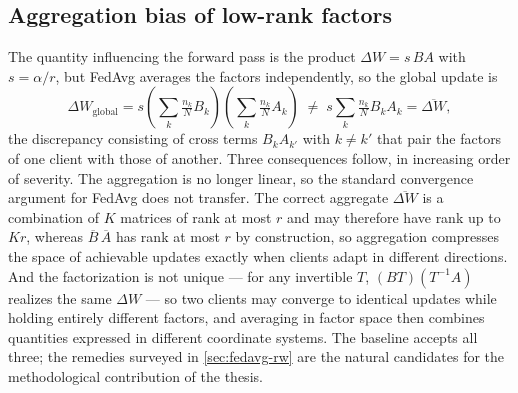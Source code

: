 \subsection{Aggregation bias of low-rank factors}\label{sec:bias}

The quantity influencing the forward pass is the product $\Delta W=s\,BA$ with $s=\alpha/r$, but FedAvg averages the factors independently, so the global update is
\begin{equation}\label{eq:bias}
\Delta W_{\mathrm{global}}=s\left(\sum_{k}\tfrac{n_{k}}{N}B_{k}\right)\left(\sum_{k}\tfrac{n_{k}}{N}A_{k}\right)\;\neq\;s\sum_{k}\tfrac{n_{k}}{N}B_{k}A_{k}=\overline{\Delta W},
\end{equation}
the discrepancy consisting of cross terms $B_{k}A_{k'}$ with $k\neq k'$ that pair the factors of one client with those of another. Three consequences follow, in increasing order of severity. The aggregation is no longer linear, so the standard convergence argument for FedAvg does not transfer. The correct aggregate $\overline{\Delta W}$ is a combination of $K$ matrices of rank at most $r$ and may therefore have rank up to $Kr$, whereas $\overline{B}\,\overline{A}$ has rank at most $r$ by construction, so aggregation compresses the space of achievable updates exactly when clients adapt in different directions. And the factorization is not unique --- for any invertible $T$, $(BT)(T^{-1}A)$ realizes the same $\Delta W$ --- so two clients may converge to identical updates while holding entirely different factors, and averaging in factor space then combines quantities expressed in different coordinate systems. The baseline accepts all three; the remedies surveyed in \cref{sec:fedavg-rw} are the natural candidates for the methodological contribution of the thesis.

